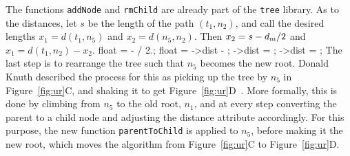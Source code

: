 The functions \texttt{addNode} and \texttt{rmChild} are already part
of the \texttt{tree} library.  As to the distances, let $s$ be the
length of the path $(t_1,n_2)$, and call the desired lengths
$x_1=d(t_1,n_5)$ and $x_2=d(n_5,n_2)$. Then $x_2 = s - d_{\rm m} /2$
and $x_1 = d(t_1,n_2) - x_2$.
\nwenddocs{}\endmoddef\nwstartdeflinemarkup{}\nwenddeflinemarkup
float  =  -  / 2.;
float  = ->dist - ;
->dist = ;
->dist = ;
\nwendcode{}\nwdocspar
The last step is to rearrange the tree such that $n_5$ becomes the new
root. Donald Knuth described the process for this as picking up the
tree by $n_5$ in Figure~\ref{fig:ur}C, and shaking it to get
Figure~\ref{fig:ur}D~\cite[p. 371]{knu97:ar1}. More formally, this is
done by climbing from $n_5$ to the old root, $n_1$, and at every step
converting the parent to a child node and adjusting the distance
attribute accordingly. For this purpose, the new function
\texttt{parentToChild} is applied to $n_5$, before making it the new
root, which moves the algorithm from Figure~\ref{fig:ur}C to
Figure~\ref{fig:ur}D.
